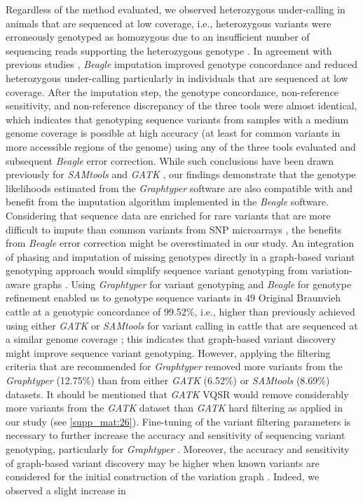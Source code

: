 \documentclass[../main.tex]{subfiles}
\begin{document}
Regardless of the method evaluated, we observed heterozygous under-calling in animals that are sequenced at low coverage, i.e., heterozygous variants were erroneously genotyped as homozygous due to an insufficient number of sequencing reads supporting the heterozygous genotype \citep{nielsen2011genotype,sims2014sequencing,fragoso2016imputing,bilton2018linkage}. In agreement with previous studies \citep{Jansen2013,Daetwyler2014}, \emph{Beagle} imputation improved genotype concordance and reduced heterozygous under-calling particularly in individuals that are sequenced at low coverage. After the imputation step, the genotype concordance, non-reference sensitivity, and non-reference discrepancy of the three tools were almost identical, which indicates that genotyping sequence variants from samples with a medium genome coverage is possible at high accuracy (at least for common variants in more accessible regions of the genome) using any of the three tools evaluated and subsequent \emph{Beagle} error correction. While such conclusions have been drawn previously for \emph{SAMtools} and \emph{GATK} \citep{Jansen2013,baes2014evaluation}, our findings demonstrate that the genotype likelihoods estimated from the \emph{Graphtyper} software are also compatible with and benefit from the imputation algorithm implemented in the \emph{Beagle} software. Considering that sequence data are enriched for rare variants that are more difficult to impute than common variants from SNP microarrays \citep{pausch2017evaluation}, the benefits from \emph{Beagle} error correction might be overestimated in our study. An integration of phasing and imputation of missing genotypes directly in a graph-based variant genotyping approach would simplify sequence variant genotyping from variation-aware graphs \citep{rakocevic2019fast,siren2020haplotype,novak2017graph}. Using \emph{Graphtyper} for variant genotyping and \emph{Beagle} for genotype refinement enabled us to genotype sequence variants in 49 Original Braunvieh cattle at a genotypic concordance of 99.52\%, i.e., higher than previously achieved using either \emph{GATK} or \emph{SAMtools} for variant calling in cattle that are sequenced at a similar genome coverage \citep{Jansen2013,Stothard2015,Boussaha2016,Daetwyler2014,baes2014evaluation,stafuzza2017single}; this indicates that graph-based variant discovery might improve sequence variant genotyping. However, applying the filtering criteria that are recommended for \emph{Graphtyper} \citep{eggertsson2017graphtyper} removed more variants from the \emph{Graphtyper} (12.75\%) than from either \emph{GATK} (6.52\%) or \emph{SAMtools} (8.69\%) datasets. It should be mentioned that \emph{GATK} VQSR would remove considerably more variants from the \emph{GATK} dataset than \emph{GATK} hard filtering as applied in our study (see \ref{supp_mat:26}). Fine-tuning of the variant filtering parameters is necessary to further increase the accuracy and sensitivity of sequencing variant genotyping, particularly for \emph{Graphtyper} \citep{carson2014effective,jun2015efficient}. Moreover, the accuracy and sensitivity of graph-based variant discovery may be higher when known variants are considered for the initial construction of the variation graph \citep{eggertsson2017graphtyper}. Indeed, we observed a slight increase in 
\end{document}
